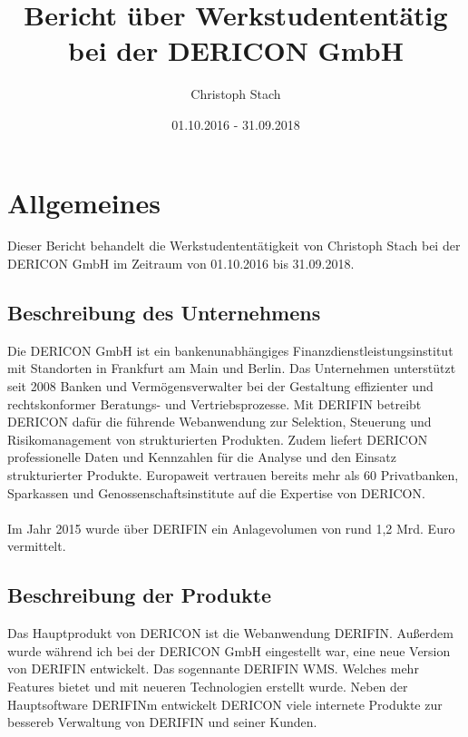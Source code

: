 \documentclass{article}
\title{Bericht über Werkstudententätig bei der DERICON GmbH}
\author{Christoph Stach}
\date{01.10.2016 - 31.09.2018}
\begin{document}
    \begin{titlepage}
        \maketitle
        \thispagestyle{empty}
    \end{titlepage}

    \renewcommand*\contentsname{Inhaltsverzeichnis}
    \tableofcontents
    \pagebreak

    \section{Allgemeines}

    Dieser Bericht behandelt die Werkstudententätigkeit von Christoph Stach bei der DERICON GmbH im Zeitraum von 01.10.2016 bis 31.09.2018.

    \subsection{Beschreibung des Unternehmens}

    Die DERICON GmbH ist ein bankenunabhängiges Finanzdienstleistungsinstitut mit Standorten in Frankfurt am Main und Berlin.
    Das Unternehmen unterstützt seit 2008 Banken und Vermögensverwalter bei der Gestaltung effizienter und rechtskonformer Beratungs- und Vertriebsprozesse.
    Mit DERIFIN betreibt DERICON dafür die führende Webanwendung zur Selektion, Steuerung und Risikomanagement von strukturierten Produkten.
    Zudem liefert DERICON professionelle Daten und Kennzahlen für die Analyse und den Einsatz strukturierter Produkte.
    Europaweit vertrauen bereits mehr als 60 Privatbanken, Sparkassen und Genossenschaftsinstitute auf die Expertise von DERICON.
    \\ \\
    Im Jahr 2015 wurde über DERIFIN ein Anlagevolumen von rund 1,2 Mrd. Euro vermittelt.

    \subsection{Beschreibung der Produkte}

    Das Hauptprodukt von DERICON ist die Webanwendung DERIFIN. Außerdem wurde während ich bei der DERICON GmbH eingestellt war,
    eine neue Version von DERIFIN entwickelt. Das sogennante DERIFIN WMS. Welches mehr Features bietet und mit neueren Technologien erstellt wurde.
    Neben der Hauptsoftware DERIFINm entwickelt DERICON viele internete Produkte zur bessereb Verwaltung von DERIFIN und seiner Kunden.
\end{document}
